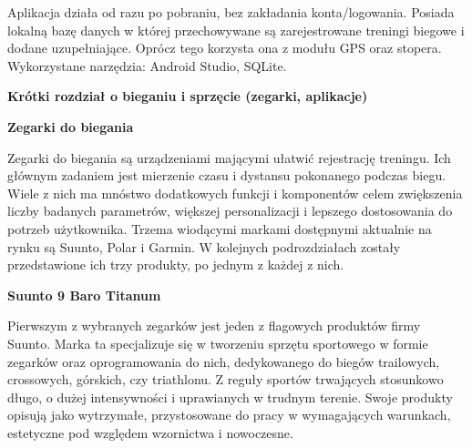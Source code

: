 \documentclass[a4paper,12pt,reqno]{article}
\begin{document}
Aplikacja działa od razu po pobraniu, bez zakładania konta/logowania. Posiada lokalną bazę danych w której przechowywane są zarejestrowane treningi biegowe i dodane uzupełniające. Oprócz tego korzysta ona z modułu GPS oraz stopera. Wykorzystane narzędzia: Android Studio, SQLite.
\newpage

\begin{flushleft}
	\Large \textbf{Krótki rozdział o bieganiu i sprzęcie (zegarki, aplikacje)}
\end{flushleft}
\vspace{1cm}

\newpage
\begin{flushleft}
	\Large \textbf{Zegarki do biegania}
\end{flushleft}
\vspace{1cm}

Zegarki do biegania są urządzeniami mającymi ułatwić rejestrację treningu. Ich głównym zadaniem jest mierzenie czasu i dystansu pokonanego podczas biegu. Wiele z nich ma mnóstwo dodatkowych funkcji i komponentów celem zwiększenia liczby badanych parametrów, większej personalizacji i lepszego dostosowania do potrzeb użytkownika. Trzema wiodącymi markami dostępnymi aktualnie na rynku są Suunto, Polar i Garmin. W kolejnych podrozdziałach zostały przedstawione ich trzy produkty, po jednym z każdej z nich.
\vspace{1cm}
\begin{flushleft}
	\textbf{Suunto 9 Baro Titanum}
\end{flushleft}

Pierwszym z wybranych zegarków jest jeden z flagowych produktów firmy Suunto. Marka ta specjalizuje się w tworzeniu sprzętu sportowego w formie zegarków oraz oprogramowania do nich, dedykowanego do biegów trailowych, crossowych, górskich, czy triathlonu. Z reguły sportów trwających stosunkowo długo, o dużej intensywności i uprawianych w trudnym terenie. Swoje produkty opisują jako wytrzymałe, przystosowane do pracy w wymagających warunkach, estetyczne pod względem wzornictwa i nowoczesne.\\
\end{document}
